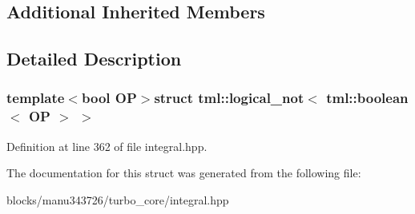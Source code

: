 \subsection*{Additional Inherited Members}


\subsection{Detailed Description}
\subsubsection*{template$<$bool O\+P$>$struct tml\+::logical\+\_\+not$<$ tml\+::boolean$<$ O\+P $>$ $>$}



Definition at line 362 of file integral.\+hpp.



The documentation for this struct was generated from the following file\+:\begin{DoxyCompactItemize}
\item 
blocks/manu343726/turbo\+\_\+core/integral.\+hpp\end{DoxyCompactItemize}
